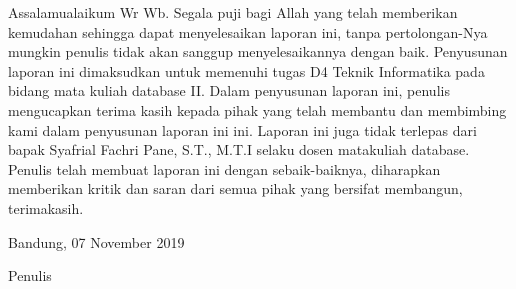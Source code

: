 \begin{acknowledgements}
Assalamualaikum Wr Wb. Segala puji bagi Allah yang telah memberikan kemudahan sehingga dapat menyelesaikan laporan ini, tanpa pertolongan-Nya mungkin penulis tidak akan sanggup menyelesaikannya dengan baik. Penyusunan laporan ini dimaksudkan untuk memenuhi tugas D4 Teknik Informatika pada bidang mata kuliah database II. Dalam penyusunan laporan ini, penulis mengucapkan terima kasih kepada pihak yang telah membantu dan membimbing kami dalam penyusunan laporan ini ini. Laporan ini juga tidak terlepas dari bapak Syafrial Fachri Pane, S.T., M.T.I selaku dosen matakuliah database. Penulis telah membuat laporan ini dengan sebaik-baiknya, diharapkan memberikan kritik dan saran dari semua pihak yang bersifat membangun, terimakasih.

\begin{raggedleft}

Bandung, 07 November 2019

Penulis

\end{raggedleft}

\end{acknowledgements}